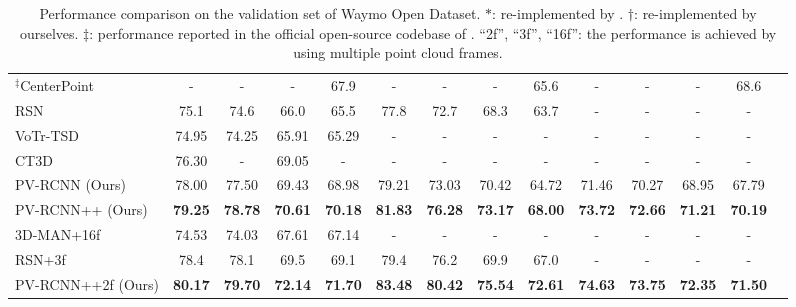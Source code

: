 \documentclass[natbib,twocolumn]{svjour3}          \smartqed  \usepackage{graphicx}
\begin{document}
\begin{table*}
\begin{center}
{\begin{tabular}{l||cc|cc|cc|cc|cc|ccl}
				$^\ddagger$CenterPoint~\citep{yin2021center} & - & - & - & 67.9 & -  & - & - & 65.6	& - & - & - & 68.6\\
				RSN~\citep{sun2021rsn} & 75.1 & 74.6 & 66.0 & 65.5 &  77.8 & 72.7 & 68.3 & 63.7 & - & - & - & - \\
				VoTr-TSD~\citep{mao2021voxel} & 74.95 & 74.25 & 65.91 & 65.29& - & - & - & -& - & - & - & -\\
				CT3D~\citep{sheng2021} & 76.30 & - & 69.05 & - & - & - & - & -& - & - & - & -  \\
				PV-RCNN (Ours) & 78.00 & 77.50 &	69.43 & 68.98 & 79.21 & 73.03 & 70.42 & 64.72	& 71.46 & 70.27 & 68.95 & 67.79\\
				PV-RCNN++ (Ours)  & \textbf{79.25} & \textbf{78.78} & 	\textbf{70.61} & \textbf{70.18} & \textbf{81.83} & \textbf{76.28} & \textbf{73.17} & \textbf{68.00} & \textbf{73.72} & \textbf{72.66} & \textbf{71.21} & \textbf{70.19} \\ 
				\hline
				3D-MAN+16f~\citep{yang20213d} & 74.53 & 74.03 & 67.61 & 67.14 & - & - & - & -& - & - & - & - \\
				RSN+3f~\citep{sun2021rsn} & 78.4 & 78.1 & 69.5 & 69.1 & 79.4 & 76.2 &  69.9 & 67.0 & - & - & - & - \\
				PV-RCNN++2f (Ours) & \textbf{80.17} & \textbf{79.70} & \textbf{72.14} & \textbf{71.70} & \textbf{83.48} & \textbf{80.42} & 	\textbf{75.54} & \textbf{72.61} & \textbf{74.63} & \textbf{73.75} & \textbf{72.35} & \textbf{71.50}\\
				\hline
		\end{tabular}}
	\end{center}
    \vspace{-3mm}
	\caption{Performance comparison on the validation set of Waymo Open Dataset. 
		$*$: re-implemented by \citep{zhou2020end}. 
		$\dagger$: re-implemented by ourselves. 
		$\ddagger$: performance reported in the official open-source codebase of \citep{yin2021center}.
		``2f'', ``3f'', ``16f'': the performance is achieved by using multiple point cloud frames. 
	}
	\label{tab:waymo_val}
	\vspace{-2mm}
\end{table*} 
\end{document}
